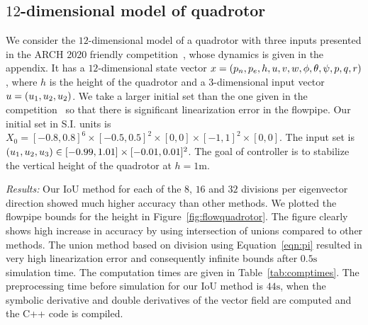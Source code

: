 \subsection{$12$-dimensional model of quadrotor}
We consider the $12$-dimensional model of a quadrotor with three
inputs presented in the ARCH 2020 friendly
competition~\cite{geretti2020arch}, whose dynamics is given in the
appendix.  It has a $12$-dimensional state vector $x
= \left(p_n,p_e,h,u,v,w,\phi,\theta,\psi,p,q,r\right)$, where $h$ is the
height of the quadrotor and a $3$-dimensional input vector $u
= \left(u_1,u_2,u_2\right)$.  We take a larger initial set than the one given
in the competition~\cite{geretti2020arch} so that there is significant
linearization error in the flowpipe.  Our initial set in S.I. units
is $X_0 = [-0.8,0.8]^6\times[-0.5,0.5]^2\times[0,0]\times
[-1,1]^2\times[0,0]$.  The input set is $\left(u_1,u_2,u_3\right)\in
[-0.99,1.01]\times[-0.01,0.01]^2$.  The goal of controller is to
stabilize the vertical height of the quadrotor at $h = 1\si{\meter}$.

  

\emph{Results:}  Our IoU method for each of the $8$, $16$ and $32$ divisions per
  eigenvector direction showed much higher accuracy than other
  methods.  We plotted the flowpipe bounds for the height in
  Figure~\ref{fig:flowquadrotor}.  The figure clearly shows high
  increase in accuracy by using intersection of unions compared to
  other methods.  The union method based on division using
  Equation~\ref{eqn:pi} resulted in very high linearization error and
  consequently infinite bounds after $0.5\si{\second}$ simulation
  time.  The computation times are given in Table~\ref{tab:comptimes}.
  The preprocessing time before simulation for our IoU method is
  $44\si{\second}$, when the symbolic derivative and double
  derivatives of the vector field are computed and the C++ code is compiled.
%
